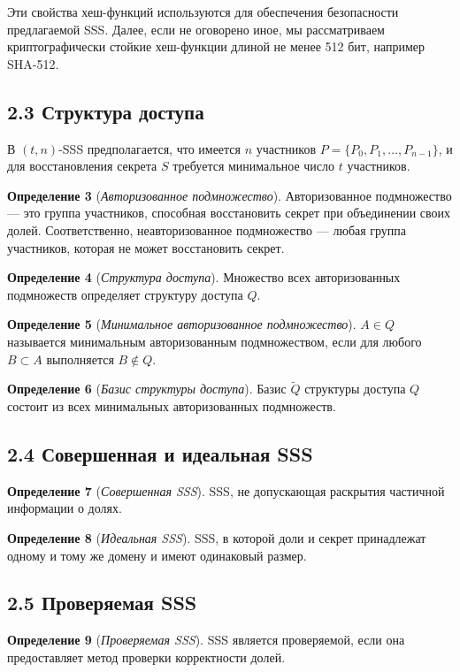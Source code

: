 Эти свойства хеш-функций используются для обеспечения безопасности предлагаемой SSS. Далее, если не оговорено иное, мы рассматриваем криптографически стойкие хеш-функции длиной не менее 512 бит, например SHA-512.

\subsection*{2.3 \quad Структура доступа}

В \((t,n)\)-SSS предполагается, что имеется \(n\) участников \(P=\{P_0,P_1,\ldots,P_{n-1}\}\), и для восстановления секрета \(S\) требуется минимальное число \(t\) участников.

\textbf{Определение 3} (\textit{Авторизованное подмножество}). Авторизованное подмножество — это группа участников, способная восстановить секрет при объединении своих долей. Соответственно, неавторизованное подмножество — любая группа участников, которая не может восстановить секрет.

\textbf{Определение 4} (\textit{Структура доступа}). Множество всех авторизованных подмножеств определяет структуру доступа \(Q\).

\textbf{Определение 5} (\textit{Минимальное авторизованное подмножество}). \(A\in Q\) называется минимальным авторизованным подмножеством, если для любого \(B\subset A\) выполняется \(B\notin Q\).

\textbf{Определение 6} (\textit{Базис структуры доступа}). Базис \(\tilde{Q}\) структуры доступа \(Q\) состоит из всех минимальных авторизованных подмножеств.

\subsection*{2.4 \quad Совершенная и идеальная SSS}

\textbf{Определение 7} (\textit{Совершенная SSS}). SSS, не допускающая раскрытия частичной информации о долях.

\textbf{Определение 8} (\textit{Идеальная SSS}). SSS, в которой доли и секрет принадлежат одному и тому же домену и имеют одинаковый размер.

\subsection*{2.5 \quad Проверяемая SSS}

\textbf{Определение 9} (\textit{Проверяемая SSS}). SSS является проверяемой, если она предоставляет метод проверки корректности долей.

